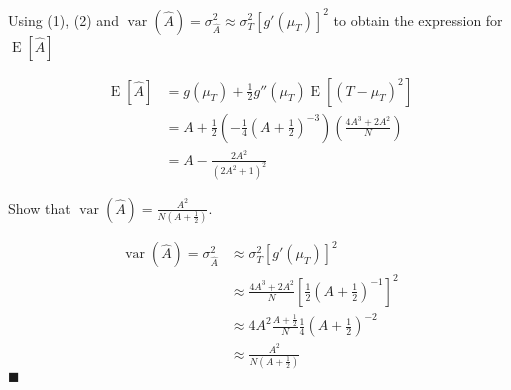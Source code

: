 \documentclass{exam}
\theoremstyle{mytheoremstyle}
\theoremstyle{mytheoremstyle}
\theoremstyle{myproblemstyle}
\begin{document}
\begin{questions}
	\question Using (1), (2) and \(\displaystyle\operatorname{var}\left(\hat{A}\right)=\sigma^{2}_{\hat{A}}\approx\sigma^{2}_{T}\left[g'\left(\mu_{T}\right)\right]^{2}\) to obtain the expression for \(\operatorname{E}\left[\hat{A}\right]\)

	\begin{solution}
		\begin{align*}
			\operatorname{E}\left[\hat{A}\right] & =g(\mu_{T})+\frac{1}{2}g''(\mu_{T})\operatorname{E}\left[(T-\mu_{T})^{2}\right]                            \\
			                                     & =A+\frac{1}{2}\left(-\frac{1}{4}\left(A+\frac{1}{2}\right)^{-3}\right)\left(\frac{4A^{3}+2A^{2}}{N}\right) \\
			                                     & =A-\frac{2A^{2}}{(2A^{2}+1)^{2}}
		\end{align*}
	\end{solution}

	\newpage

	\question Show that \(\displaystyle\operatorname{var}\left(\hat{A}\right)=\frac{A^2}{N\left(A+\frac{1}{2}\right)}\).

	\begin{solution}
		\begin{align*}
			\operatorname{var}\left(\hat{A}\right)=\sigma^{2}_{\hat{A}} & \approx\sigma^{2}_{T}\left[g'\left(\mu_{T}\right)\right]^{2}                              \\
			                                                            & \approx\frac{4A^{3}+2A^{2}}{N}\left[\frac{1}{2}\left(A+\frac{1}{2}\right)^{-1}\right]^{2} \\
			                                                            & \approx4A^{2}\frac{A+\frac{1}{2}}{N}\frac{1}{4}\left(A+\frac{1}{2}\right)^{-2}            \\
			                                                            & \approx\frac{A^2}{N\left(A+\frac{1}{2}\right)}
		\end{align*}
		\center \(\blacksquare\)
	\end{solution}
\end{questions}
\end{document}
